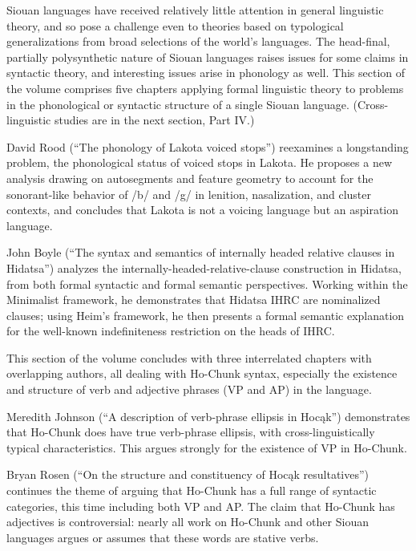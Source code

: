 \begin{refsection}

Siouan languages have received relatively little attention in general linguistic theory, and so pose a challenge even to theories based on typological generalizations from broad selections of the world's languages. The head-final, partially polysynthetic nature of Siouan languages raises issues for some claims in syntactic theory, and interesting issues arise in phonology as well. This section of the volume comprises five chapters applying formal linguistic theory to problems in the phonological or syntactic structure of a single Siouan language. (Cross-linguistic studies are in the next section, Part IV.)

David Rood (``The phonology of Lakota voiced stops'') reexamines a longstanding problem, the phonological status of voiced stops in Lakota. He proposes a new analysis drawing on autosegments and feature geometry to account for the sonorant-like behavior of /b/ and /g/ in lenition, nasalization, and cluster contexts, and concludes that Lakota is not a voicing language but an aspiration language. 

John Boyle (``The syntax and semantics of internally headed relative clauses in Hidatsa'') analyzes the internally-headed-relative-clause construction in Hidatsa, from both formal syntactic and formal semantic perspectives. Working within the Minimalist framework, he demonstrates that Hidatsa IHRC are nominalized clauses; using Heim's framework, he then presents a formal semantic explanation for the well-known indefiniteness restriction on the heads of IHRC. 

This section of the volume concludes with three interrelated chapters with overlapping authors, all dealing with Ho-Chunk syntax, especially the existence and structure of verb and adjective phrases (VP and AP) in the language.

Meredith Johnson (``A description of verb-phrase ellipsis in Hoc\k{a}k'') demonstrates that Ho-Chunk does have true verb-phrase ellipsis, with cross-linguistically typical characteristics. This argues strongly for the existence of VP in Ho-Chunk.

Bryan Rosen (``On the structure and constituency of Hoc\k{a}k resultatives'') continues the theme of arguing that Ho-Chunk has a full range of syntactic categories, this time including both VP and AP. The claim that Ho-Chunk has adjectives is controversial: nearly all work on Ho-Chunk and other Siouan languages argues or assumes that these words are stative verbs.


\end{refsection}
